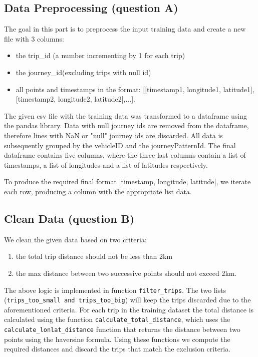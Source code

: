 \documentclass[12pt]{article}
\begin{document}
	\subsection{Data Preprocessing (question A)}
	The goal in this part is to preprocess the input training data and create a
  new file with 3 columns:
  \begin{itemize}
  \item  the trip\_id (a number incrementing by 1 for each trip)
  \item the journey\_id(excluding trips with null id)
  \item all points and timestamps in the format: [[timestamp1, longitude1,
    latitude1], [timestamp2, longitude2, latitude2],...].
  \end{itemize}
  The given csv file with the training data was transformed to a dataframe using
  the pandas library. Data with null journey ids are removed from the dataframe,
  therefore lines with NaN or "null" journey ids are discarded. All data is
  subsequently grouped by the vehicleID and the journeyPatternId. The final dataframe contains five columns, where the three last columns contain a list of timestamps, a list of longitudes and a list of latitudes respectively.
	
	To produce the required final format [timestamp, longitude, latitude], we
  iterate each row, producing a column with the appropriate list data.
	
	\subsection{Clean Data (question B)}
	We clean the given data based on two criteria:
  \begin{enumerate}
  \item the total trip distance should not be less than 2km
  \item the max distance between two successive points should not exceed 2km.
    \end{enumerate}
	
	The above logic is implemented in function \texttt{filter\_trips}. The two
  lists (\texttt{trips\_too\_small and trips\_too\_big}) will keep the trips
  discarded due to the aforementioned criteria. For each trip in the training
  dataset the total distance is calculated using the function
  \texttt{calculate\_total\_distance}, which uses the
  \texttt{calculate\_lonlat\_distance} function that returns the distance
  between two points using the haversine formula. Using these functions we
  compute the required distances and discard the trips that match the exclusion
  criteria.
	
\end{document}
